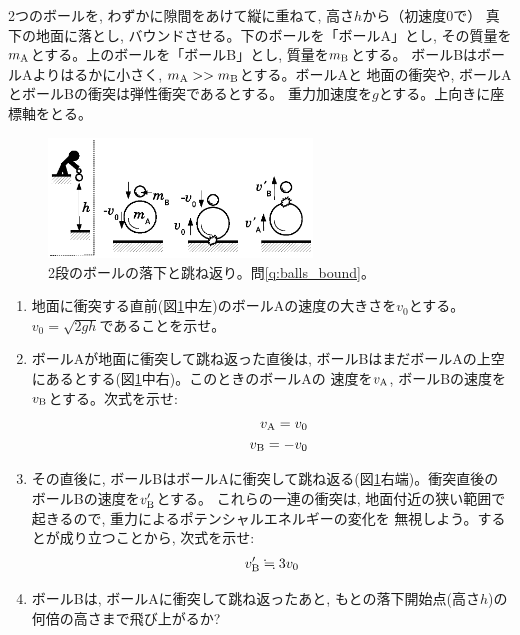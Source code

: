 \begin{q}\label{q:balls_bound}
2つのボールを, わずかに隙間をあけて縦に重ねて, 高さ$h$から（初速度0で）
真下の地面に落とし, バウンドさせる。下のボールを「ボールA」とし, 
その質量を$m_{\text A}$とする。上のボールを「ボールB」とし, 質量を$m_{\text B}$とする。
ボールBはボールAよりはるかに小さく, $m_{\text A}>>m_{\text B}$とする。ボールAと
地面の衝突や, ボールAとボールBの衝突は弾性衝突であるとする。
重力加速度を$g$とする。上向きに座標軸をとる。

\begin{figure}[h]
    \centering
    \includegraphics[width=7cm]{balls_bound.eps}
    \caption{2段のボールの落下と跳ね返り。問\ref{q:balls_bound}。}\label{fig:balls_bound}
\end{figure}

\begin{enumerate}
\item 地面に衝突する直前(図\ref{fig:balls_bound}中左)のボールAの速度の大きさを$v_0$とする。$v_0=\sqrt{2gh}$であることを示せ。
\item ボールAが地面に衝突して跳ね返った直後は, ボールBはまだボールAの上空にあるとする(図\ref{fig:balls_bound}中右)。このときのボールAの
速度を$v_{\text A}$, ボールBの速度を$v_{\text B}$とする。次式を示せ:
\begin{eqnarray}
&&v_{\text A}=v_0\\
&&v_{\text B}=-v_0
\end{eqnarray}
\item その直後に, ボールBはボールAに衝突して跳ね返る(図\ref{fig:balls_bound}右端)。衝突直後のボールBの速度を$v'_{\text B}$とする。
これらの一連の衝突は, 地面付近の狭い範囲で起きるので, 重力によるポテンシャルエネルギーの変化を
無視しよう。するとが成り立つことから, 次式を示せ:
\begin{eqnarray}
v'_{\text B}\fallingdotseq 3v_0\label{eq:balls_bound4}
\end{eqnarray}
\item ボールBは, ボールAに衝突して跳ね返ったあと, もとの落下開始点(高さ$h$)の何倍の高さまで飛び上がるか?
\end{enumerate}
\end{q}
\mv

